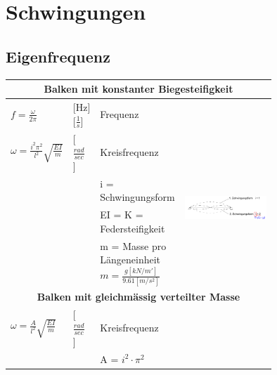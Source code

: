 

	\begin{minipage}{\linewidth}
		
		\section{Schwingungen}
		
		\subsection{Eigenfrequenz}
		
			
		\begin{tabular}{l|l|p{0.25\linewidth}p{0.5\linewidth}}
			
			\multicolumn{4}{c}{\textbf{Balken mit konstanter Biegesteifigkeit}} \\ \hline
		
			$ f = \frac{\omega}{2 \pi} $ & [Hz][$ \frac{1}{s} $]	& Frequenz	&  \\ \hline
			
			$ \omega = \frac{i^2 \pi^2}{l^2} \sqrt{ \frac{EI}{m} } $ & [ $ \frac{rad}{sec} $ ]	& Kreisfrequenz 	& \multirow{4}{*}{\includegraphics[width=\linewidth]{images/Schwingung1Schwingungsform.PNG} }\\
						&				& i = Schwingungsform 	& \\
						&				& EI = K = Federsteifigkeit & \\ 
						&				& m = Masse pro Längeneinheit $ m = \frac{g [kN/m'] }{9.61 [m/s^2]} $ & \\ \hline
					
					
			\multicolumn{4}{c}{\textbf{Balken mit gleichmässig verteilter Masse}} \\ \hline
				
			$ \omega = \frac{A}{l^2} \sqrt{ \frac{EI}{m} } $ & [ $ \frac{rad}{sec} $ ] & Kreisfrequenz & \\
						&				& A = $ i^2 \cdot \pi^2 $ &   \\ \hline
			

\end{tabular}
\end{minipage}
